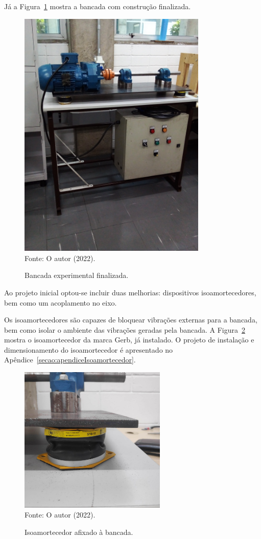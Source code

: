 \documentclass[
	12pt,				
	oneside,			
	a4paper,			
	english,			
	brazil,	
	sumario=abnt-6027-2012		
	]{abntex2ppgsi}
\begin{document}
Já a Figura~\ref{bancada_completa} mostra a bancada com construção finalizada.

\begin{figure}[H]
\centering
\caption {Bancada experimental finalizada.}
\includegraphics[width=\textwidth,height=120mm,keepaspectratio,angle=-90]{bancada_completa} \\
Fonte: O autor (2022).
\label{bancada_completa}
\end{figure}

Ao projeto inicial optou-se incluir duas melhorias: dispositivos isoamortecedores, bem como um acoplamento no eixo.

Os isoamortecedores são capazes de bloquear vibrações externas para a bancada, bem como isolar o ambiente das vibrações geradas pela bancada. A Figura~\ref{isoamortecedor_bancada} mostra o isoamortecedor da marca Gerb, já instalado. O projeto de instalação e dimensionamento do isoamortecedor é apresentado no Apêndice~\ref{secao:apendiceIsoamortecedor}. 
 
\begin{figure}[H]
\centering
\caption {Isoamortecedor afixado à bancada.}
\includegraphics[width=\textwidth,height=70mm,keepaspectratio]{isoamortecedor_bancada} \\
Fonte: O autor (2022).
\label{isoamortecedor_bancada}
\end{figure}
\end{document}
